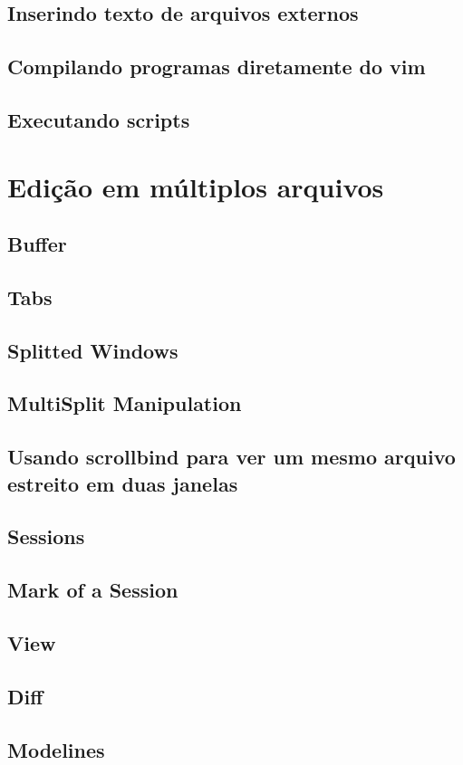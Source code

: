 \documentclass[a4paper, 12pt]{article}
\begin{document}
\subsection{Inserindo texto de arquivos externos}
\subsection{Compilando programas diretamente do vim}
\subsection{Executando scripts}
\section{Edição em múltiplos arquivos}
\subsection{Buffer}
\subsection{Tabs}
\subsection{Splitted Windows}
\subsection{MultiSplit Manipulation}
\subsection{Usando scrollbind para ver um mesmo arquivo estreito em duas janelas}
\subsection{Sessions}
\subsection{Mark of a Session}
\subsection{View}
\subsection{Diff}
\subsection{Modelines}
\end{document}
